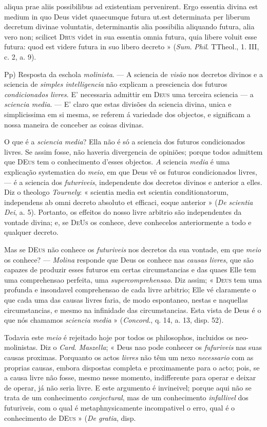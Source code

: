 aliqua prae aliis possibilibus ad existentiam pervenirent. Ergo essentia divina est medium in quo Deus videt quaecumque futura ut.est determinata per liberum decretum divinae voluntatis, determinantis alia possibilia aliquando futura, alia vero non; scilicet \textsc{Drus} videt in sua essentia omnia futura, quia libere voluit esse futura: quod est videre futura in suo libero decreto » (\emph{Sum}. \emph{Phil}. TTheol., 1. III, c. 2, a. 9).\par Pp) Resposta da eschola \emph{molinista}. --- A sciencia de \emph{visão} nos decretos divinos e a sciencia de \emph{simples intelligencia} não explicam a presciencia dos futuros \emph{condicionados livres}. E' necessaria admittir em \textsc{Deus} uma terceira sciencia --- a \emph{sciencia media}. --- E' claro que estas divisões da sciencia divina, unica e simplicissima em si mesma, se referem á variedade dos objectos, e significam a nossa maneira de conceber as coisas divinas.\par O que é a \emph{sciencia media}? Ella não é só a sciencia dos futuros condicionados livres. Se assim fosse, não haveria divergencia de opiniões; porque todos admittem que \textsc{DEus} tem o conhecimento d'esses objectos. \emph{A} sciencia \emph{media} é uma explicação systematica do \emph{meio}, em que Deus vê os futuros condicionados livres, --- é a sciencia dos \emph{futwriveis}, independente dos decretos divinos e anterior a elles. Diz o theologo \emph{Tournely}: « scientia media est scientia conditionatorum, independens ab omni decreto absoluto et efficaci, eoque anterior » (\emph{De scientia Dei}, a. 5). Portanto, os effeitos do nosso livre arbitrio são independentes da vontade divina; e, se \textsc{DeUs} os conhece, deve conhecelos anteriormente a todo e qualquer decreto.\par Mas se \textsc{DEus} não conhece os \emph{futuriveis} nos decretos da sua vontade, em que \emph{meio} os conhece? --- \emph{Molina} responde que Deus os conhece nas \emph{causas livres}, que são capazes de produzir esses futuros em certas circumstancias e das quaes Elle tem uma comprehensao perfeita, uma \emph{supercomprehensao}. Diz assim; « \textsc{Deus} tem uma profunda e insondavel comprehensao de cada livre arbitrio; Elle vé claramente o que cada uma das causas livres faria, de modo espontaneo, nestas e naquellas circumstancias, e mesmo na infinidade das circumstancias. Esta vista de Deus é o que nós chamamos \emph{sciencia media} » (\emph{Concord}., q. 14, a. 13, disp. 52).\par Todavia este \emph{meio} é rejeitado hoje por todos os philosophos, incluidos os neo-molinistas. Diz o \emph{Card}. \emph{Maszella}; « Deus nao pode conhecer os \emph{fufuriveis} nas suas causas proximas. Porquanto os actos \emph{livres} não têm um nexo \emph{necessario} com as proprias causas, embora dispostas completa e proximamente para o acto; pois, se a causa livre não fosse, mesmo nesse momento, indifferente para operar e deixar de operar, já não seria livre. E este argumento é invineivel; porque aqui não se trata de um conhecimento \emph{conjectural}, mas de um conhecimento \emph{infallivel} dos futuriveis, com o qual é metaphnysicamente incompativel o erro, qual é o conhecimento de \textsc{DEus} » (\emph{De gratia}, disp. 